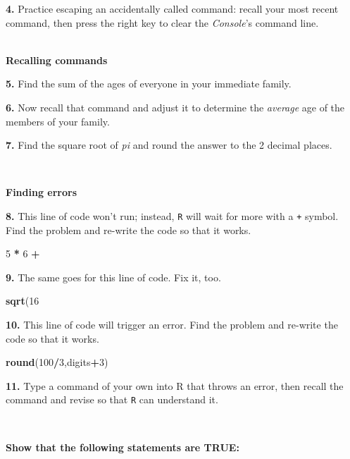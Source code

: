\documentclass[]{book}
\newenvironment{Shaded}{\begin{snugshade}}{\end{snugshade}}
\newcommand{\DecValTok}[1]{\textcolor[rgb]{0.00,0.00,0.81}{#1}}
\newcommand{\KeywordTok}[1]{\textcolor[rgb]{0.13,0.29,0.53}{\textbf{#1}}}
\newcommand{\NormalTok}[1]{#1}
\newcommand{\OperatorTok}[1]{\textcolor[rgb]{0.81,0.36,0.00}{\textbf{#1}}}
\newcommand{\StringTok}[1]{\textcolor[rgb]{0.31,0.60,0.02}{#1}}
\begin{document}
\textbf{4.} Practice escaping an accidentally called command: recall your most recent command, then press the right key to clear the \emph{Console}'s command line.

~\\
\textbf{Recalling commands}

\textbf{5.} Find the sum of the ages of everyone in your immediate family.

\textbf{6.} Now recall that command and adjust it to determine the \emph{average} age of the members of your family.

\textbf{7.} Find the square root of \emph{pi} and round the answer to the 2 decimal places.

~

\textbf{Finding errors}

\textbf{8.} This line of code won't run; instead, \texttt{R} will wait for more with a \texttt{+} symbol. Find the problem and re-write the code so that it works.

\begin{Shaded}
\begin{Highlighting}[]
\DecValTok{5} \OperatorTok{*}\StringTok{ }\DecValTok{6} \OperatorTok{+}
\end{Highlighting}
\end{Shaded}

\textbf{9.} The same goes for this line of code. Fix it, too.

\begin{Shaded}
\begin{Highlighting}[]
\KeywordTok{sqrt}\NormalTok{(}\DecValTok{16}
\end{Highlighting}
\end{Shaded}

\textbf{10.} This line of code will trigger an error. Find the problem and re-write the code so that it works.

\begin{Shaded}
\begin{Highlighting}[]
\KeywordTok{round}\NormalTok{(}\DecValTok{100}\OperatorTok{/}\DecValTok{3}\NormalTok{,digits}\OperatorTok{+}\DecValTok{3}\NormalTok{)}
\end{Highlighting}
\end{Shaded}

\textbf{11.} Type a command of your own into R that throws an error, then recall the command and revise so that \texttt{R} can understand it.

~

\textbf{Show that the following statements are TRUE:}
\end{document}

